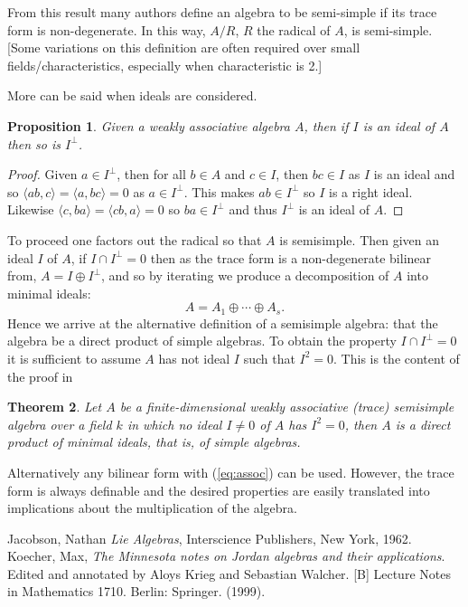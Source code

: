 \documentclass[12pt]{article}
\newtheorem{thm}{Theorem}
\newtheorem{prop}[thm]{Proposition}
\providecommand{\intersect}{\cap}
\begin{document}
From this result many authors define an algebra to be semi-simple if its trace
form is non-degenerate.  In this way, $A/R$, $R$ the radical of $A$, is semi-simple.  [Some variations on this definition are often required over small
fields/characteristics, especially when characteristic is 2.]

More can be said when ideals are considered.

\begin{prop}
Given a weakly associative algebra $A$, then
if $I$ is an ideal of $A$ then so is $I^\perp$.
\end{prop}
\begin{proof}
Given $a\in I^\perp$, then for all $b\in A$ and $c\in I$, then $bc\in I$
as $I$ is an ideal and so $\langle ab,c\rangle=\langle a,bc\rangle=0$
as $a\in I^\perp$.  This makes $ab\in I^\perp$ so $I$ is a right ideal.
Likewise $\langle c,ba\rangle=\langle cb,a\rangle=0$ so $ba\in I^\perp$ and
thus $I^\perp$ is an ideal of $A$.
\end{proof}

To proceed one factors out the radical so that $A$ is semisimple.  Then
given an ideal $I$ of $A$, if $I\intersect I^\perp=0$ then as the trace form
is a non-degenerate bilinear from, $A=I\oplus I^\perp$, and so by iterating
we produce a decomposition of $A$ into minimal ideals:
 \[A=A_1\oplus \cdots\oplus A_s.\]
Hence we arrive at the alternative definition of a semisimple algebra: that the
algebra be a direct product of simple algebras.  To obtain the property $I\intersect I^\perp=0$ it is sufficient to assume $A$ has not ideal $I$ 
such that $I^2=0$.  This is the content of the proof in

\begin{thm}\cite[Thm III.3]{Jac}
Let $A$ be a finite-dimensional weakly associative (trace) semisimple 
algebra over a field $k$ in which no ideal $I\neq 0$ of $A$ has $I^2=0$,
then $A$ is a direct product of minimal ideals, that is, of simple
algebras.
\end{thm}

Alternatively any bilinear form with (\ref{eq:assoc}) can be used.  However,
the trace form is always definable and the desired properties are easily translated into implications about the multiplication of the algebra.

\begin{thebibliography}{8}
Jacobson, Nathan \emph{Lie Algebras}, Interscience Publishers, New York, 1962.\\

Koecher, Max, \emph{The Minnesota notes on Jordan algebras and their applications}. 
	Edited and annotated by Aloys Krieg and Sebastian Walcher. 
	[B] Lecture Notes in Mathematics 1710. Berlin: Springer. (1999).
\end{thebibliography}

\end{document}
